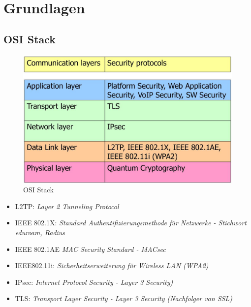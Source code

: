 


\newcommand{\INSTITUTE}{Hochschule für Technik Rapperswil}
\newcommand{\SUBJECT}{Zusammenfassung}
\newcommand{\TITLE}{Informationssicherheit 2}
\newcommand{\AUTHORONE}{Julian Klaiber}
\newcommand{\AUTHORTWO}{Severin Dellsperger}



\tableofcontents



\section{Grundlagen}
\subsection{OSI Stack}
\begin{figure}[h]
\centering
\includegraphics[width=0.7\linewidth]{images/sec_osi_stack}
\caption{OSI Stack}
\end{figure}

\begin{itemize}
    \item L2TP: \textit{Layer 2 Tunneling Protocol}
    \item IEEE 802.1X: \textit{Standard Authentifizierungsmethode für Netzwerke - Stichwort eduroam, Radius}
    \item IEEE 802.1AE \textit{MAC Security Standard - MACsec}
    \item IEEE802.11i: \textit{Sicherheitserweiterung für Wireless LAN (WPA2)}
    \item IPsec: \textit{Internet Protocol Security - Layer 3 Security)}
    \item TLS: \textit{Transport Layer Security - Layer 3 Security (Nachfolger von SSL)}
\end{itemize}


